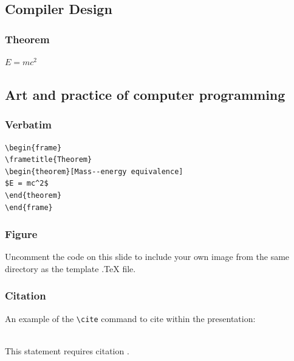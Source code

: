 \documentclass{beamer}
\begin{document}

\subsection{Compiler Design}

\begin{frame}
\frametitle{Theorem}
\begin{theorem}
$E = mc^2$
\end{theorem}
\end{frame}


\subsection{Art and practice of computer programming}

\begin{frame}[fragile] %
\frametitle{Verbatim}
\begin{example}
\begin{verbatim}
\begin{frame}
\frametitle{Theorem}
\begin{theorem}[Mass--energy equivalence]
$E = mc^2$
\end{theorem}
\end{frame}\end{verbatim}
\end{example}
\end{frame}


\begin{frame}
\frametitle{Figure}
Uncomment the code on this slide to include your own image from the same directory as the template .TeX file.
\end{frame}


\begin{frame}[fragile] %
\frametitle{Citation}
An example of the \verb|\cite| command to cite within the presentation:\\~

This statement requires citation \cite{birch}.
\end{frame}
\end{document}
